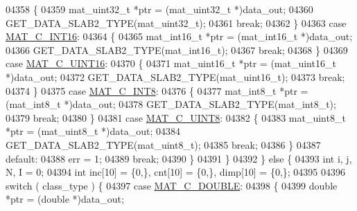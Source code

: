 \begin{DoxyCode}
{{{{{{{{{{{{{{{{{{{{{{{{{04358                 \{
04359                     mat\_uint32\_t *ptr = (mat\_uint32\_t *)data\_out;
04360                     GET\_DATA\_SLAB2\_TYPE(mat\_uint32\_t);
04361                     \textcolor{keywordflow}{break};
04362                 \}
04363                 \textcolor{keywordflow}{case} \hyperlink{group___m_a_t_ggad4d60ae7b709fc81bfd744fb4c857c40a40370e9de516c5036a67a5865c071006}{MAT\_C\_INT16}:
04364                 \{
04365                     mat\_int16\_t *ptr = (mat\_int16\_t *)data\_out;
04366                     GET\_DATA\_SLAB2\_TYPE(mat\_int16\_t);
04367                     \textcolor{keywordflow}{break};
04368                 \}
04369                 \textcolor{keywordflow}{case} \hyperlink{group___m_a_t_ggad4d60ae7b709fc81bfd744fb4c857c40a8bede21dbf6c1edc0bbccc1481bccae7}{MAT\_C\_UINT16}:
04370                 \{
04371                     mat\_uint16\_t *ptr = (mat\_uint16\_t *)data\_out;
04372                     GET\_DATA\_SLAB2\_TYPE(mat\_uint16\_t);
04373                     \textcolor{keywordflow}{break};
04374                 \}
04375                 \textcolor{keywordflow}{case} \hyperlink{group___m_a_t_ggad4d60ae7b709fc81bfd744fb4c857c40a984ff310f9e906100fcff95f704f43c5}{MAT\_C\_INT8}:
04376                 \{
04377                     mat\_int8\_t *ptr = (mat\_int8\_t *)data\_out;
04378                     GET\_DATA\_SLAB2\_TYPE(mat\_int8\_t);
04379                     \textcolor{keywordflow}{break};
04380                 \}
04381                 \textcolor{keywordflow}{case} \hyperlink{group___m_a_t_ggad4d60ae7b709fc81bfd744fb4c857c40a81270f8093cb4808e992c1d29d84d4e3}{MAT\_C\_UINT8}:
04382                 \{
04383                     mat\_uint8\_t *ptr = (mat\_uint8\_t *)data\_out;
04384                     GET\_DATA\_SLAB2\_TYPE(mat\_uint8\_t);
04385                     \textcolor{keywordflow}{break};
04386                 \}
04387                 \textcolor{keywordflow}{default}:
04388                     err = 1;
04389                     \textcolor{keywordflow}{break};
04390             \}
04391         \}
04392     \} \textcolor{keywordflow}{else} \{
04393         \textcolor{keywordtype}{int} i, j, N, I = 0;
04394         \textcolor{keywordtype}{int} inc[10] = \{0,\}, cnt[10] = \{0,\}, dimp[10] = \{0,\};
04395 
04396         \textcolor{keywordflow}{switch} ( class\_type ) \{
04397             \textcolor{keywordflow}{case} \hyperlink{group___m_a_t_ggad4d60ae7b709fc81bfd744fb4c857c40a5d70e0862e5bdb7bd86bf7ba5948f307}{MAT\_C\_DOUBLE}:
04398             \{
04399                 \textcolor{keywordtype}{double} *ptr = (\textcolor{keywordtype}{double} *)data\_out;
}}}}}}}}}}}}}}}}}}}}}}}}}
\end{DoxyCode}
